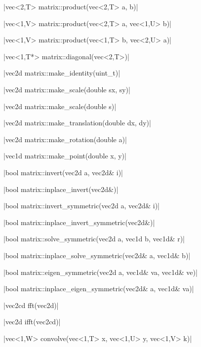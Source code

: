 \funcitem \cppinline|vec<2,T> matrix::product(vec<2,T> a, b)| 

\cppinline|vec<1,V> matrix::product(vec<2,T> a, vec<1,U> b)|

\cppinline|vec<1,V> matrix::product(vec<1,T> b, vec<2,U> a)|

\funcitem \cppinline|vec<1,T*> matrix::diagonal(vec<2,T>)| 

\funcitem \cppinline|vec2d matrix::make_identity(uint_t)| 

\funcitem \cppinline|vec2d matrix::make_scale(double sx, sy)| 

\cppinline|vec2d matrix::make_scale(double s)|

\funcitem \cppinline|vec2d matrix::make_translation(double dx, dy)| 

\funcitem \cppinline|vec2d matrix::make_rotation(double a)| 

\funcitem \cppinline|vec1d matrix::make_point(double x, y)| 

\funcitem {} \cppinline|bool matrix::invert(vec2d a, vec2d& i)| 

 \cppinline|bool matrix::inplace_invert(vec2d&)| 

 \cppinline|bool matrix::invert_symmetric(vec2d a, vec2d& i)| 

 \cppinline|bool matrix::inplace_invert_symmetric(vec2d&)| 

\funcitem {} \cppinline|bool matrix::solve_symmetric(vec2d a, vec1d b, vec1d& r)| 

 \cppinline|bool matrix::inplace_solve_symmetric(vec2d& a, vec1d& b)| 

\funcitem {} \cppinline|bool matrix::eigen_symmetric(vec2d a, vec1d& va, vec1d& ve)| 

 \cppinline|bool matrix::inplace_eigen_symmetric(vec2d& a, vec1d& va)| 

\funcitem {} \cppinline|vec2cd fft(vec2d)| 

 \cppinline|vec2d ifft(vec2cd)| 

\funcitem \cppinline|vec<1,W> convolve(vec<1,T> x, vec<1,U> y, vec<1,V> k)| 
